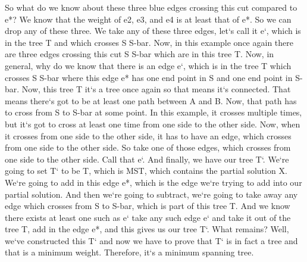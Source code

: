 So what do we know about these three blue edges crossing this cut compared to e*? We know that the weight of e2, e3, and e4 is at least that of e*.
So we can drop any of these three.
We take any of these three edges, let`s call it e`, which is in the tree T and which crosses S S-bar.
Now, in this example once again there are three edges crossing this cut S S-bar which are in this tree T\@.
Now, in general, why do we know that there is an edge e`, which is in the tree T which crosses S S-bar where this edge e* has one end point in S and one end point in S-bar.
Now, this tree T it`s a tree once again so that means it`s connected.
That means there`s got to be at least one path between A and B\@.
Now, that path has to cross from S to S-bar at some point.
In this example, it crosses multiple times, but it`s got to cross at least one time from one side to the other side.
Now, when it crosses from one side to the other side, it has to have an edge, which crosses from one side to the other side.
So take one of those edges, which crosses from one side to the other side.
Call that e`.
And finally, we have our tree T`.
We`re going to set T` to be T, which is MST, which contains the partial solution X\@.
We`re going to add in this edge e*, which is the edge we`re trying to add into our partial solution.
And then we`re going to subtract, we`re going to take away any edge which crosses from S to S-bar, which is part of this tree T\@.
And we know there exists at least one such as e` take any such edge e` and take it out of the tree T, add in the edge e*, and this gives us our tree T`.
What remains? Well, we`ve constructed this T` and now we have to prove that T` is in fact a tree and that is a minimum weight.
Therefore, it`s a minimum spanning tree.

